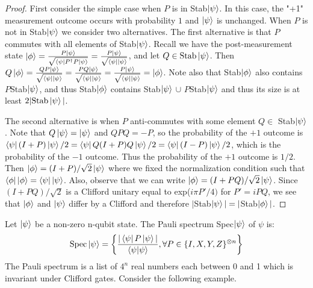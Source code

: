 \documentclass[12pt]{dalthesis}
\begin{document}
\begin{proof}
First consider the simple case when $P$ is in Stab$\ket{\psi}$. In this case, the "+1" measurement outcome occurs with probability $1$ and $\ket{\psi}$ is unchanged. When $P$ is not in Stab$\ket{\psi}$ we consider two alternatives. The first alternative is that $P$ commutes with all elements of Stab$\ket{\psi}$. Recall we have the post-measurement state $\ket{\phi} = \frac{P\ket{\psi}}{\sqrt{\bra{\psi}P^{\dag}P\ket{\psi}}} = \frac{P\ket{\psi}}{\sqrt{\bra{\psi}\ket{\psi}}}$, and let $Q \in \text{Stab}\ket{\psi}$. Then $Q\ket{\phi} = \frac{QP\ket{\psi}}{\sqrt{\bra{\psi}\ket{\psi}}} = \frac{PQ\ket{\psi}}{\sqrt{\bra{\psi}\ket{\psi}}} = \frac{P\ket{\psi}}{\sqrt{\bra{\psi}\ket{\psi}}} = \ket{\phi}$. Note also that Stab$\ket{\phi}$ also contains $P$Stab$\ket{\psi}$, and thus Stab$\ket{\phi}$ contains Stab$\ket{\psi}$ $\cup$ $P$Stab$\ket{\psi}$ and thus its size is at least $2| \text{Stab}\ket{\psi}|$.

The second alternative is when $P$ anti-commutes with some element $Q \in$ Stab$\ket{\psi}$. Note that $Q\ket{\psi} = \ket{\psi}$ and $QPQ = -P$, so the probability of the $+1$ outcome is $\bra{\psi}(I+P)\ket{\psi}/2 = \bra{\psi}Q(I+P)Q\ket{\psi}/2 = \bra{\psi}(I-P)\ket{\psi}/2$, which is the probability of the $-1$ outcome. Thus the probability of the $+1$ outcome is $1/2$. Then $\ket{\phi} = (I+P)/\sqrt{2}\ket{\psi}$ where we fixed the normalization condition such that $\bra{\phi}\ket{\phi} = \bra{\psi}\ket{\psi}$. Also, observe that we can write $\ket{\phi} = (I+PQ)/\sqrt{2}\ket{\psi}$. Since $(I+PQ)/\sqrt{2}$ is a Clifford unitary equal to exp($i\pi P'/4)$ for $P' = iPQ$, we see that $\ket{\phi}$ and $\ket{\psi}$ differ by a Clifford and therefore $|$Stab$\ket{\psi}| = |$Stab$\ket{\phi}|$.
\end{proof}

\begin{definition}
Let $\ket{\psi}$ be a non-zero n-qubit state. The Pauli spectrum Spec$\ket{\psi}$ of $\psi$ is:
\begin{equation}
\text{Spec}\ket{\psi} = \left\{ \frac{|\bra{\psi}P\ket{\psi}|}{\braket{\psi|\psi}}, \forall P \in \{I, X, Y, Z\}^{\otimes n} \right\}
\end{equation}
The Pauli spectrum is a list of $4^n$ real numbers each between 0 and 1 which is invariant under Clifford gates. Consider the following example.
\end{definition}
\end{document}

